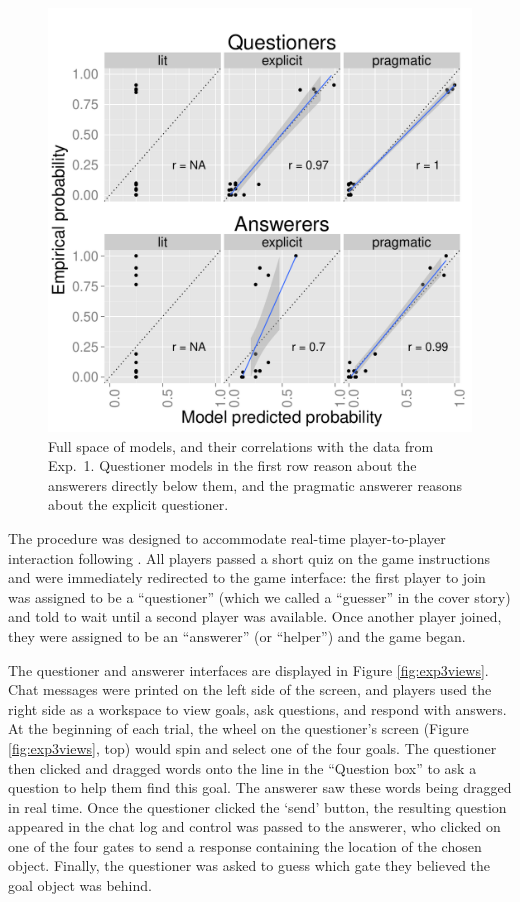 \documentclass[12pt, floatsintext, jou]{apa6}
\begin{document}
\begin{figure}[t!]
\begin{center}
\includegraphics[scale=.75]{Exp3ModelFits.pdf}
\end{center}
\caption{Full space of models, and their correlations with the data from Exp.~1. Questioner models in the first row reason about the answerers directly below them, and the pragmatic answerer reasons about the explicit questioner.}
\label{fig:Exp3ModelSpace}
\end{figure}
The procedure was designed to accommodate real-time player-to-player interaction following . All players passed a short quiz on the game instructions and were immediately redirected to the game interface: the first player to join was assigned to be a ``questioner'' (which we called a ``guesser'' in the cover story) and told to wait until a second player was available. Once another player joined, they were assigned to be an ``answerer'' (or ``helper'') and the game began. 



The questioner and answerer interfaces are displayed in Figure \ref{fig:exp3views}. Chat messages were printed on the left side of the screen, and players used the right side as a workspace to view goals, ask questions, and respond with answers. At the beginning of each trial, the wheel on the questioner's screen (Figure \ref{fig:exp3views}, top) would spin and select one of the four goals. The questioner then clicked and dragged words onto the line in the ``Question box'' to ask a question to help them find this goal. The answerer saw these words being dragged in real time. Once the questioner clicked the `send' button, the resulting question appeared in the chat log and control was passed to the answerer, who clicked on one of the four gates to send a response containing the location of the chosen object. Finally, the questioner was asked to guess which gate they believed the goal object was behind. 
\end{document}
